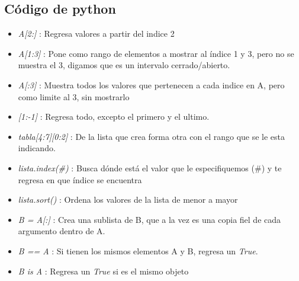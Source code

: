 \documentclass{book}
\begin{document}
	\subsection {Código de python}
	\begin{itemize}
		\item {\textit{A[2:]}} : Regresa valores a partir del indice 2
		\item {\textit{A[1:3]}} : Pone como rango de elementos a mostrar al índice 1 y 3, pero no se muestra el 3, digamos que es un intervalo cerrado/abierto.
		\item {\textit{A[:3]}} : Muestra todos los valores que pertenecen a cada indice en A, pero como limite al 3, sin mostrarlo
		\item {\textit{[1:-1]}} : Regresa todo, excepto el primero y el ultimo.
		
		\item {\textit{tabla[4:7][0:2]}} : De la lista que crea forma otra con el rango que se le esta indicando.
		
		\item {\textit{lista.index(\#)}} : Busca dónde está el valor que le especifiquemos (\#) y te regresa en que índice se encuentra
		
		\item \textit{lista.sort()} : Ordena los valores de la lista de menor a mayor
		\item \textit{B = A[:]} : Crea una sublista de B, que a la vez es una copia fiel de cada argumento dentro de A.
		\item \textit{B == A} : Si tienen los mismos elementos A y B, regresa un \textit{True}.
		\item \textit{B is A} : Regresa un \textit{True} si es el mismo objeto
		
	\end{itemize}
	
	
\end{document}
